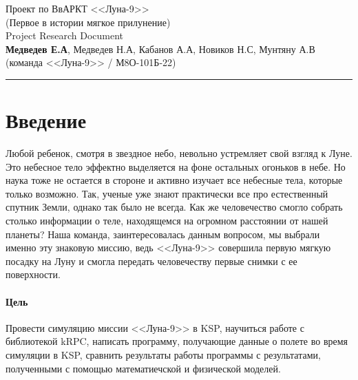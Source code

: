
\newcommand{\tus}{\textunderscore}


\begin{center}
	\huge{Проект по ВвАРКТ <<Луна-9>>} \\
	\large{(Первое в истории мягкое прилунение)} \\
	\Large{Project Research Document}\\
	\large{\textbf{Медведев Е.А}, Медведев Н.А, Кабанов А.А, Новиков Н.С, Мунтяну А.В} \\
	\large{(команда <<Луна-9>> / М8О-101Б-22)}
	\rule{\textwidth}{0.1pt}
\end{center}

\section*{Введение}
\noindent Любой ребенок, смотря в звездное небо, невольно устремляет свой взгляд к Луне. Это небесное тело эффектно выделяется на фоне остальных огоньков в небе. Но наука тоже не остается в стороне и активно изучает все небесные тела, которые только возможно. Так, ученые уже знают практически все про естественный спутник Земли, однако так было не всегда. Как же человечество смогло собрать столько информации о теле, находящемся на огромном расстоянии от нашей планеты? Наша команда, заинтересовалась данным вопросом,  мы выбрали именно эту знаковую миссию, ведь <<Луна-9>> совершила первую мягкую посадку на Луну и смогла передать человечеству первые снимки с ее поверхности. 
\paragraph{Цель} Провести симуляцию миссии <<Луна-9>> в KSP, научиться работе с библиотекой kRPC, написать программу, получающие данные о полете во время симуляции в KSP, сравнить результаты работы программы с результатами, полученными с помощью математиечской и физической моделей.

